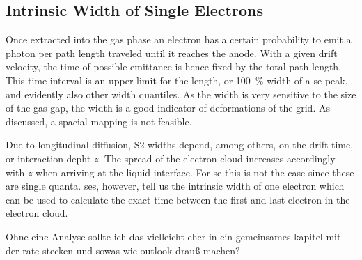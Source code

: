 
\FloatBarrier
\subsection{Intrinsic Width of Single Electrons}
\label{ssec:width}
\FloatBarrier


Once extracted into the gas phase an electron has a certain probability to emit a photon per path length traveled until it reaches the anode. %
With a given drift velocity, the time of possible emittance is hence fixed by the total path length.
This time interval is an upper limit for the length, or \SI{100}{\%} width of a \gls{se} peak, and evidently also other width quantiles.
As the width is very sensitive to the size of the gas gap, the width is a good indicator of deformations of the grid.
As discussed, a spacial mapping is not feasible.

Due to longitudinal diffusion, S2 widths depend, among others, on the drift time, or interaction depht $ z $.
The spread of the electron cloud increases accordingly with $ z $ when arriving at the liquid interface.
For \gls{se} this is not the case since these are single quanta.
\glspl{se}, however, tell us the intrinsic width of one electron which can be used to calculate the exact time between the first and last electron in the electron cloud.


Ohne eine Analyse sollte ich das vielleicht eher in ein gemeinsames kapitel mit der rate stecken und sowas wie outlook drauß machen?









